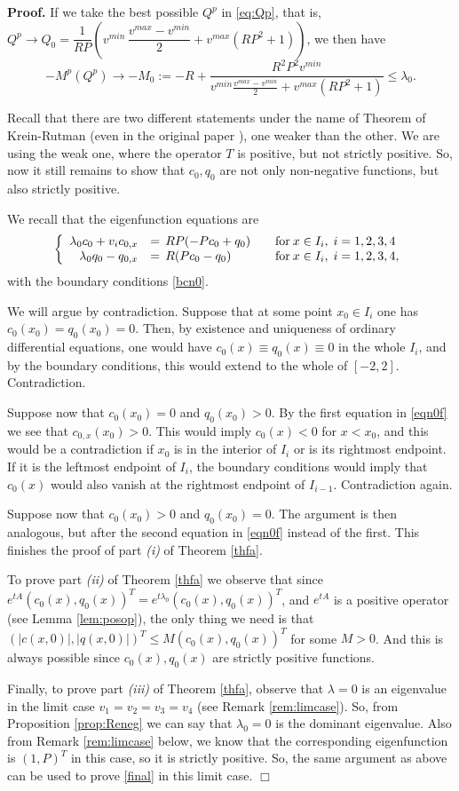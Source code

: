 \documentclass[a4paper]{article}
\numberwithin{equation}{section}
\newenvironment{pf}{\vspace{0.5em}\noindent\textbf{Proof.} }{\quad \hfill $\Box$ \\ \vspace{0.2em}\\}
\begin{document}
\begin{pf}
If we take the best possible $Q^p$ in \eqref{eq:Qp}, that is, $Q^p\to Q_0 =\dfrac{1 }{RP}\left(v^{min} \,\dfrac{v^{max}-v^{min}}{2}+v^{max}\left(RP^2+1\right)  \right)$, we then have
$$-M^p(Q^p) \to -M_0 := -R+\dfrac{R^2P^2v^{min}}{v^{min}\frac{v^{max}-v^{min}}{2} +v^{max}(RP^2+1)} \leq \lambda_0.$$

Recall that there are two different statements under the name of Theorem of Krein-Rutman (even in the original paper \cite{KR}), one weaker than the other. We are using the weak one, where the operator $T$ is positive, but not strictly positive. So, now it still remains to show that $c_0,q_0$ are not only non-negative functions, but also strictly positive.

We recall that the eigenfunction equations are
\begin{equation}\label{eqn0f}
\left\{ \begin{array}{rll}
\lambda_0 c_0+v_i c_{0,x}&=\,RP(-Pc_0+q_0)\quad &\hbox{for}\: x\in I_i, \; i=1,2,3,4 \\
\lambda_0 q_0-q_{0,x}&=\,R(Pc_0-q_0)\quad &\hbox{for}\: x\in I_i, \; i=1,2,3,4,
\end{array}\right.
\end{equation}
with the boundary conditions \eqref{bcn0}.

We will argue by contradiction. Suppose that at some point $x_0\in I_i$ one has $c_0(x_0)=q_0(x_0)=0$. Then, by existence and uniqueness of ordinary differential equations, one would have $c_0(x)\equiv q_0(x)\equiv 0$ in the whole $I_i$, and by the boundary conditions, this would extend to the whole of $[-2,2]$. Contradiction.

Suppose now that $c_0(x_0)=0$ and $q_0(x_0)>0$. By the first equation in \eqref{eqn0f} we see that $c_{0,x}(x_0)>0$. This would imply $c_0(x)<0$ for $x<x_0$, and this would be a contradiction if $x_0$ is in the interior of $I_i$ or is its rightmost endpoint. If it is the leftmost endpoint of $I_i$, the boundary conditions would imply that $c_0(x)$  would also vanish at the rightmost endpoint of $I_{i-1}$. Contradiction again.

Suppose now that $c_0(x_0)>0$ and $q_0(x_0)=0$. The argument is then analogous, but after the second equation in \eqref{eqn0f} instead of the first. This finishes the proof of part {\it (i)} of Theorem \ref{thfa}.

To prove part {\it (ii)} of Theorem \ref{thfa} we observe that since $e^{tA}(c_0(x),q_0(x))^T= e^{t\lambda_0}(c_0(x),q_0(x))^T$, and $e^{tA}$ is a positive operator (see Lemma \ref{lem:posop}), the only thing we need is that $(|c(x,0)|,|q(x,0)|)^T\le M(c_0(x),q_0(x))^T$ for some $M>0$. And this is always possible since $c_0(x),q_0(x)$ are strictly positive functions.

Finally, to prove part {\it (iii)} of Theorem \ref{thfa}, observe that $\lambda=0$ is an eigenvalue in the limit case   $v_1=v_2=v_3=v_4$ (see Remark \ref{rem:limcase}). So, from Proposition \ref{prop:Reneg} we can say that $\lambda_0=0$ is the dominant eigenvalue. Also from Remark \ref{rem:limcase} below, we know that the corresponding eigenfunction is $(1,P)^T$ in this case, so it is strictly positive. So, the same argument as above can be used to prove \eqref{final} in this limit case.
\end{pf}
\end{document}
